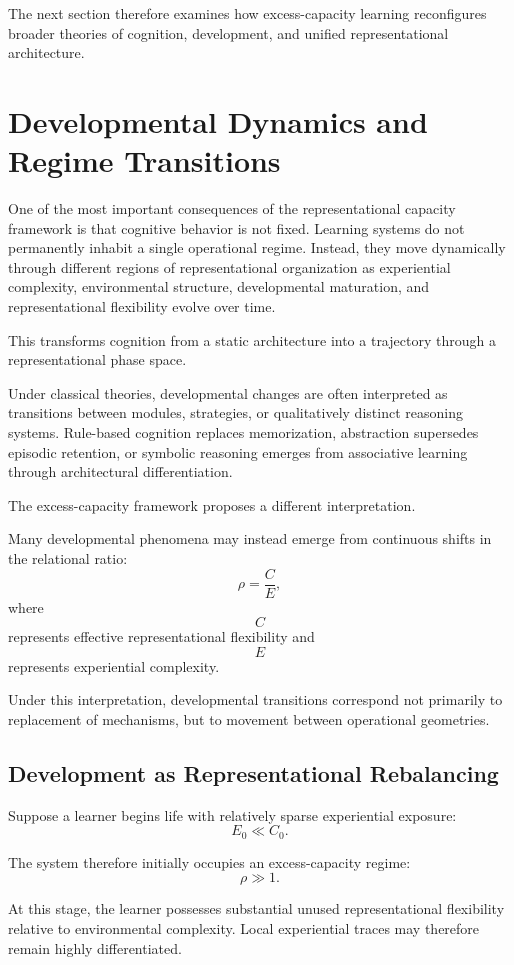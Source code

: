 \documentclass[12pt,a4paper]{article}
\begin{document}
The next section therefore examines how excess-capacity learning reconfigures broader theories of cognition, development, and unified representational architecture.

\section{Developmental Dynamics and Regime Transitions}
\label{sec:developmental-dynamics}

One of the most important consequences of the representational capacity framework is that cognitive behavior is not fixed. Learning systems do not permanently inhabit a single operational regime. Instead, they move dynamically through different regions of representational organization as experiential complexity, environmental structure, developmental maturation, and representational flexibility evolve over time.

This transforms cognition from a static architecture into a trajectory through a representational phase space.

Under classical theories, developmental changes are often interpreted as transitions between modules, strategies, or qualitatively distinct reasoning systems. Rule-based cognition replaces memorization, abstraction supersedes episodic retention, or symbolic reasoning emerges from associative learning through architectural differentiation.

The excess-capacity framework proposes a different interpretation.

Many developmental phenomena may instead emerge from continuous shifts in the relational ratio:
\[
\rho
=
\frac{C}{E},
\]
where
\[
C
\]
represents effective representational flexibility and
\[
E
\]
represents experiential complexity.

Under this interpretation, developmental transitions correspond not primarily to replacement of mechanisms, but to movement between operational geometries.

\subsection{Development as Representational Rebalancing}

Suppose a learner begins life with relatively sparse experiential exposure:
\[
E_0 \ll C_0.
\]

The system therefore initially occupies an excess-capacity regime:
\[
\rho \gg 1.
\]

At this stage, the learner possesses substantial unused representational flexibility relative to environmental complexity. Local experiential traces may therefore remain highly differentiated.
\end{document}
